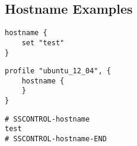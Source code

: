 \subsection{Hostname Examples}

\begin{lstlisting}[style=Sscontrol,
label={lst:hostname_example_script},
title={Sets the host name.}]
hostname {
    set "test"
}
\end{lstlisting}

\begin{lstlisting}[style=Sscontrol,
label={lst:hostname_ubuntu_profile},
title={Ubuntu hostname profile.}]
profile "ubuntu_12_04", {
    hostname {
    }
}
\end{lstlisting}

\begin{lstlisting}[style=rcfile_nonumbers,
label={lst:hostname_example},
title={Hostname configuration file example. The file is saved as "/etc/hostname".}]
# SSCONTROL-hostname
test
# SSCONTROL-hostname-END
\end{lstlisting}

